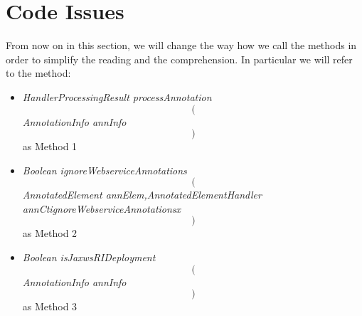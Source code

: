 \section{Code Issues}
From now on in this section, we will change the way how we call the methods in order to simplify the reading and the comprehension. \newline
In particular we will refer to the method:
\begin{itemize}
	\item \textit{HandlerProcessingResult processAnnotation $$($$AnnotationInfo annInfo$$)$$} as Method 1
	\item \textit{Boolean ignoreWebserviceAnnotations $$($$AnnotatedElement annElem,AnnotatedElementHandler annCtignoreWebserviceAnnotationsx$$)$$} as Method 2
	\item \textit{Boolean isJaxwsRIDeployment $$($$AnnotationInfo annInfo$$)$$} as Method 3
\end{itemize}

